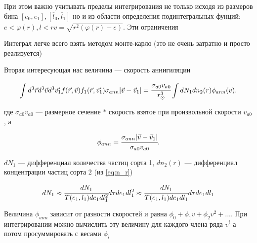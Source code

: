\begin{enumerate}
	 	При этом важно учитывать пределы интегрирования не только исходя из размеров бина $[e_0,e_1],[\overline{l}_0,\overline{l}_1]$ но и из области определения подинтегральных фунций: $e<\varphi(r), l<rv = \sqrt{r^2(\varphi(r)-e)}$. Эти ограничения 
	 	
	 	Интеграл легче всего взять методом монте-карло (это не очень затратно и просто реализуется)	 	
	 	
	 \end{enumerate}
	 
	 Вторая интересующая нас величина --- скорость аннигиляции
	 
	 \begin{equation}
	 	\label{eq:ann_st}
	 	\int{d^3\vec{r} d^3\vec{v}  d^3\vec{v_1} 
	 		f(\vec{r},\vec{v})f_1(\vec{r},\vec{v_1}) \sigma_{ann} 
	 		|\vec{v}-\vec{v}_1|} = \cfrac{\sigma_{a0}v_{a0}}{r_{\odot}^3} \int{dN_1 dn_2(r) \phi_{ann}(v) }.
	 \end{equation}
	 
	 где $\sigma_{a0}v_{a0}$ --- размерное сечение $*$ скорость взятое при произвольной скорости $v_{a0}$, а 
	 
	\begin{equation}
		\phi_{ann} = \cfrac{\sigma_{ann} |\vec{v}-\vec{v}_1| }{\sigma_{a0}  v_{a0}}.
	\end{equation}
	
	$dN_1$ --- дифференциал количества частиц сорта 1, $dn_2(r)$ --- дифференциал концентрации частиц сорта 2  (из \ref{eq:n_r})
	
	\begin{equation}
		dN_1 \approx \cfrac{dN_1}{T(e_1,l_1)de_1 dl_1^2} d\tau de_1 dl_1^2 \approx \cfrac{dN_1}{T(e_1,l_1)de_1 dl_1} d\tau de_1 dl_1 
	\end{equation}
	
	Величина $\phi_{ann}$ зависит от разности скоростей и равна $\phi_0 + \phi_1 v+ \phi_2 v^2 +...$. При интегрировании можно вычислить эту величину для каждого члена ряда $v^i$ а потом просуммировать с весами $\phi_i$
	
	
	
